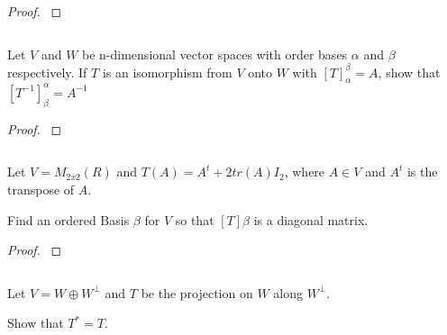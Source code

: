 \documentclass{article}
\newenvironment{customthm}[1]
  {\renewcommand\theinnercustomthm{#1}\innercustomthm}
  {\endinnercustomthm}
\begin{document}
\begin{proof}
  $ $
  
  

\end{proof}
\newpage

\begin{customthm}{8}[2023.S(2.B), 2021.F(2.A)]
  $ $

  Let $V$ and $W$ be n-dimensional vector spaces with order bases $\alpha$ and $\beta$ respectively. If $T$ is an isomorphism from $V$ onto $W$ with $[T]_\alpha^\beta = A$, show that $[T^{-1}]_\beta^\alpha = A^{-1}$

\end{customthm}

\begin{proof}
  $ $

  


\end{proof}
\newpage

\begin{customthm}{9}[2023.S(2.C)]
  $ $

  Let $V = M_{2x2}(R)$ and $T(A) = A^t + 2tr(A)I_2$, where $A \in V$ and $A^t$ is the transpose of $A$.

  Find an ordered Basis $\beta$ for $V$ so that $[T]\beta$ is a diagonal matrix.
\end{customthm}

\begin{proof}
  $ $

  


\end{proof}
\newpage


\begin{customthm}{10}[2023.S(3.B)]
  $ $

  Let $V = W \oplus W^\perp$ and $T$ be the projection on $W$ along $W^\perp$.
  
  Show that $T^* = T$.
\end{customthm}
\end{document}
